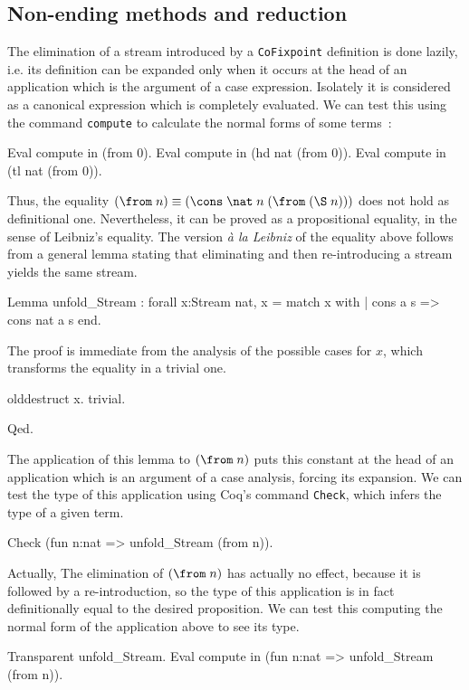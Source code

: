 \subsection{Non-ending methods and reduction}

The elimination of a stream introduced by a \verb!CoFixpoint! definition 
is done lazily, i.e. its definition can be expanded only when it occurs 
at the head of an application which is the argument of a case expression. 
Isolately it is considered as a canonical expression which 
is completely evaluated. We can test this using the command \verb!compute! 
to calculate the normal forms of some terms~:
\begin{coq_example}
Eval compute in (from 0).
Eval compute in (hd nat (from 0)).
Eval compute in (tl nat (from 0)).
\end{coq_example}
\noindent Thus, the equality 
$(\from\;n)\equiv(\cons\;\nat\;n\;(\from \; (\S\;n)))$
does not hold as definitional one. Nevertheless, it can be proved 
as a propositional  equality, in the sense of Leibniz's equality. 
The version {\it à la Leibniz} of the equality above follows from
a general lemma stating that eliminating and then re-introducing a stream
yields the same stream.
\begin{coq_example}
Lemma unfold_Stream :
   forall x:Stream nat, x = match x with
                            | cons a s => cons nat a s
                            end.
\end{coq_example}
 
\noindent The proof is immediate from the analysis of 
the possible cases for $x$, which transforms 
the equality in a trivial one.

\begin{coq_example}
olddestruct x.
trivial.
\end{coq_example}
\begin{coq_eval}
Qed.
\end{coq_eval}
The application of this lemma to  $(\from\;n)$ puts this
constant at the head of an application which is an  argument 
of a case analysis, forcing its expansion. 
We can test the type of this application using Coq's command \verb!Check!,
which infers the type of a given term. 
\begin{coq_example}
Check (fun n:nat => unfold_Stream (from n)).
\end{coq_example}
 \noindent  Actually, The elimination of $(\from\;n)$ has actually 
no effect, because it is followed by a re-introduction, 
so the type of this application is in fact 
definitionally equal to the
desired proposition. We can test this computing
the normal form of the application above to see its type.  
\begin{coq_example}
Transparent unfold_Stream.
Eval compute in (fun n:nat => unfold_Stream (from n)).
\end{coq_example}


